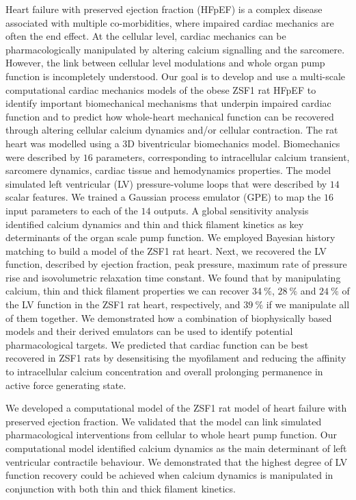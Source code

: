 \noindent
Heart failure with preserved ejection fraction (HFpEF) is a complex disease associated with multiple co-morbidities, where impaired cardiac mechanics are often the end effect. At the cellular level, cardiac mechanics can be pharmacologically manipulated by altering calcium signalling and the sarcomere. However, the link between cellular level modulations and whole organ pump function is incompletely understood. Our goal is to develop and use a multi-scale computational cardiac mechanics models of the obese ZSF1 rat HFpEF to identify important biomechanical mechanisms that underpin impaired cardiac function and to predict how whole-heart mechanical function can be recovered through altering cellular calcium dynamics and/or cellular contraction. The rat heart was modelled using a $3$D biventricular biomechanics model. Biomechanics were described by $16$ parameters, corresponding to intracellular calcium transient, sarcomere dynamics, cardiac tissue and hemodynamics properties. The model simulated left ventricular (LV) pressure-volume loops that were described by $14$ scalar features. We trained a Gaussian process emulator (GPE) to map the $16$ input parameters to each of the $14$ outputs. A global sensitivity analysis identified calcium dynamics and thin and thick filament kinetics as key determinants of the organ scale pump function. We employed Bayesian history matching to build a model of the ZSF1 rat heart. Next, we recovered the LV function, described by ejection fraction, peak pressure, maximum rate of pressure rise and isovolumetric relaxation time constant. We found that by manipulating calcium, thin and thick filament properties we can recover $\SI{34}{\percent}$, $\SI{28}{\percent}$ and $\SI{24}{\percent}$ of the LV function in the ZSF1 rat heart, respectively, and $\SI{39}{\percent}$ if we manipulate all of them together. We demonstrated how a combination of biophysically based models and their derived emulators can be used to identify potential pharmacological targets. We predicted that cardiac function can be best recovered in ZSF1 rats by desensitising the myofilament and reducing the affinity to intracellular calcium concentration and overall prolonging permanence in active force generating state.

\vspace{0.2cm}\noindent
{}

\noindent
We developed a computational model of the ZSF1 rat model of heart failure with preserved ejection fraction. We validated that the model can link simulated pharmacological interventions from cellular to whole heart pump function. Our computational model identified calcium dynamics as the main determinant of left ventricular contractile behaviour. We demonstrated that the highest degree of LV function recovery could be achieved when calcium dynamics is manipulated in conjunction with both thin and thick filament kinetics.

